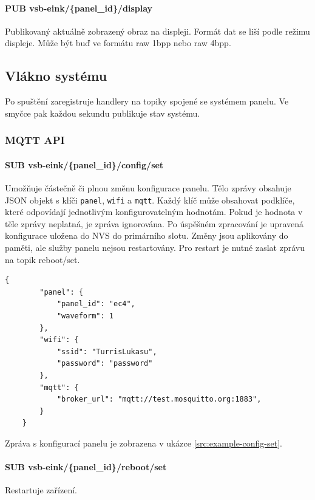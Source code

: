 \paragraph*{PUB vsb-eink/\{panel\_id\}/display}
Publikovaný aktuálně zobrazený obraz na displeji. Formát dat se liší podle režimu displeje. Může být buď ve formátu raw 1bpp nebo raw 4bpp.

\subsection{Vlákno systému}
Po spuštění zaregistruje handlery na topiky spojené se systémem panelu. Ve smyčce pak každou sekundu publikuje stav systému.

\subsubsection*{MQTT API}
\paragraph*{SUB vsb-eink/\{panel\_id\}/config/set}
Umožňuje částečně či plnou změnu konfigurace panelu. Tělo zprávy obsahuje JSON objekt s klíči \verb|panel|, \verb|wifi| a \verb|mqtt|. Každý klíč může obsahovat podklíče, které odpovídají jednotlivým konfigurovatelným hodnotám. Pokud je hodnota v těle zprávy neplatná, je zpráva ignorována. Po úspěšném zpracování je upravená konfigurace uložena do NVS do primárního slotu. Změny jsou aplikovány do paměti, ale služby panelu nejsou restartovány. Pro restart je nutné zaslat zprávu na topik reboot/set.

\begin{lstlisting}[label=src:example-config-set,caption={Ukázka změny konfigurace všech dostupných hodnot}]
    {
        "panel": {
            "panel_id": "ec4",
            "waveform": 1
        },
        "wifi": {
            "ssid": "TurrisLukasu",
            "password": "password"
        },
        "mqtt": {
            "broker_url": "mqtt://test.mosquitto.org:1883",
        }
    }
\end{lstlisting}

Zpráva s konfigurací panelu je zobrazena v ukázce \ref{src:example-config-set}.

\paragraph*{SUB vsb-eink/\{panel\_id\}/reboot/set}
Restartuje zařízení.

